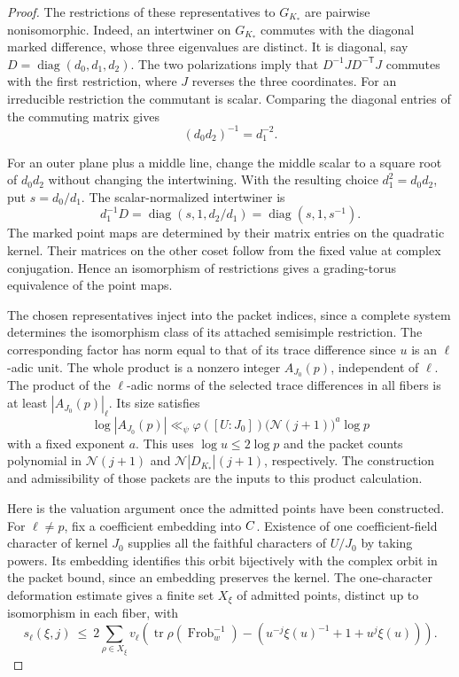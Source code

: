 \begin{proof}
The restrictions of these representatives to \(G_{K_*}\)
are pairwise nonisomorphic. Indeed, an intertwiner on
\(G_{K_*}\) commutes with the diagonal marked difference,
whose three eigenvalues are distinct. It is diagonal,
say \(D=\operatorname{diag}(d_0,d_1,d_2)\).
The two polarizations imply that
\(D^{-1}JD^{-\mathsf T}J\) commutes with the first
restriction, where \(J\) reverses the three coordinates.
For an irreducible restriction the commutant is scalar. Comparing
the diagonal entries of the commuting matrix gives
\[
 (d_0d_2)^{-1}=d_1^{-2} .
\]

For an outer plane plus a middle line, change the middle scalar
to a square root of \(d_0d_2\) without changing the intertwining.
With the resulting choice \(d_1^2=d_0d_2\), put \(s=d_0/d_1\). The scalar-normalized intertwiner is
\[
 d_1^{-1}D=\operatorname{diag}(s,1,d_2/d_1)
           =\operatorname{diag}(s,1,s^{-1}).
\]
The marked point maps are determined by their matrix
entries on the quadratic kernel. Their matrices on the
other coset follow from the fixed value at complex
conjugation. Hence an isomorphism of restrictions gives
a grading-torus equivalence of the point maps.

The chosen representatives inject into the packet indices,
since a complete system determines the isomorphism class
of its attached semisimple restriction. The corresponding
factor has norm equal to that of its trace difference since
\(u\) is an \(\ell\)-adic unit. The whole product is a nonzero
integer \(A_{J_0}(p)\), independent of \(\ell\). The product of
the \(\ell\)-adic norms of the selected trace differences
in all fibers is at least \(|A_{J_0}(p)|_\ell\). Its size satisfies
\[
 \log |A_{J_0}(p)|
    \ll_{\psi}\varphi([U:J_0])\bigl(\mathcal N(j+1)\bigr)^a
         \log p
 \tag{D}\label{eq:local-odd-d}
\]
with a fixed exponent \(a\). This uses \(\log u\le2\log p\)
and the packet counts polynomial in \(\mathcal N(j+1)\)
and \(\mathcal N |D_{K_*}|(j+1)\), respectively. The
construction and admissibility of those packets are the inputs
to this product calculation.
\label{cor:ordinary-odd-primes-3}

Here is the valuation argument once the admitted points have been
constructed. For \(\ell\ne p\), fix a coefficient embedding into
\(C\). Existence of one coefficient-field character of kernel
\(J_0\) supplies all the faithful characters of \(U/J_0\) by
taking powers. Its embedding identifies this orbit bijectively
with the complex orbit in the packet bound, since an embedding
preserves the kernel. The one-character deformation estimate
gives a finite set \(X_\xi\) of admitted points, distinct up
to isomorphism in each fiber, with
\[
 s_\ell(\xi,j)\ \le\
 2\sum_{\rho\in X_\xi}
 v_\ell\!\left(\operatorname{tr}\rho(\operatorname{Frob}_{w}^{-1})
                 -(u^{-j}\xi(u)^{-1}+1+u^j\xi(u))\right).
 \tag{L}\label{eq:local-odd-l}
\]


\end{proof}
